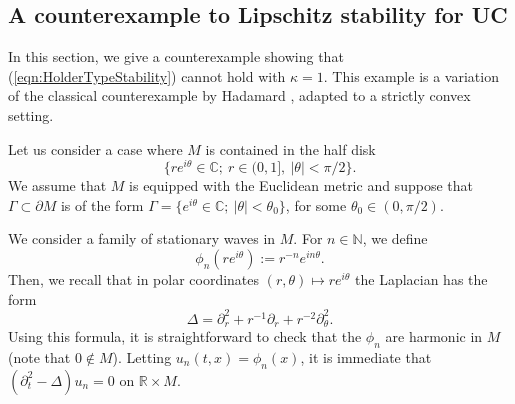 \documentclass[final,leqno]{siamart1116}
\begin{document}
\subsection{A counterexample to Lipschitz stability for UC}
\label{subsec:counterExForUC}

In this section, we give a counterexample showing that
(\ref{eqn:HolderTypeStability}) cannot hold with $\kappa = 1$.  This
example is a variation of the classical counterexample by Hadamard
\cite[p. 33]{Hadamard1953}, adapted to a strictly convex setting.

Let us consider a case where $M$ is contained in the half disk
$$
\{ r e^{i \theta} \in {\mathbb{C}};\ r \in (0,1],\ |\theta|< \pi/2\}.
$$
We assume that $M$ is equipped with the Euclidean metric and suppose
that $\Gamma \subset {\partial} M$ is of the form $\Gamma = \{ e^{i \theta}
\in {\mathbb{C}};\ |\theta|< \theta_0\}$, for some $\theta_0 \in (0, \pi/2)$.

We consider a family of stationary waves in $M$. For $n \in {\mathbb{N}}$, we define
\begin{equation*}
   \phi_n(r e^{i \theta}) := r^{-n} e^{i n \theta}.
\end{equation*}
Then, we recall that in polar coordinates $(r,\theta) \mapsto r e^{i \theta}$
the Laplacian has the form
\begin{equation*}
  \Delta = {\partial}_r^2 + r^{-1} {\partial}_r + r^{-2} {\partial}_\theta^2.
\end{equation*}
Using this formula, it is straightforward to check that the $\phi_n$
are harmonic in $M$ (note that $0 \not\in M$). Letting $u_n(t,x) =
\phi_n(x)$, it is immediate that $({\partial}_t^2 - \Delta) u_n = 0$ on ${\mathbb{R}} \times M$.
\end{document}
